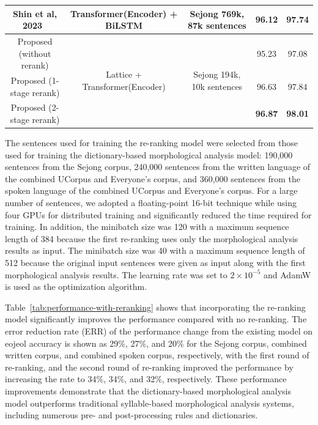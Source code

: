 \documentclass[AMS,STIX2COL]{WileyNJD-v2}
\begin{document}
\begin{table}[]
\begin{tabular*}{500pt}{@{\extracolsep\fill}ccc|cc@{\extracolsep\fill}}
            Shin et al, 2023~\cite{ShinHJ2023}    & Transformer(Encoder) + BiLSTM                   & Sejong 769k, 87k sentences                  & 96.12                      & 97.74                        \\
            \midrule
            Proposed (without rerank)             & \multirow{3}{*}{Lattice + Transformer(Encoder)} & \multirow{3}{*}{Sejong 194k, 10k sentences} & 95.23                      & 97.08                        \\
            Proposed (1-stage rerank)             & ~                                               & ~                                           & 96.63                      & 97.84                        \\
            Proposed (2-stage rerank)             & ~                                               & ~                                           & \textbf{96.87}             & \textbf{98.01}               \\
            \bottomrule
        \end{tabular*}
    \end{table}

    The sentences used for training the re-ranking model were selected from those used for training the dictionary-based morphological analysis model: 190,000 sentences from the Sejong corpus, 240,000 sentences from the written language of the combined UCorpus and Everyone's corpus, and 360,000 sentences from the spoken language of the combined UCorpus and Everyone's corpus.
    For a large number of sentences, we adopted a floating-point 16-bit technique while using four GPUs for distributed training and significantly reduced the time required for training.
    In addition, the minibatch size was 120 with a maximum sequence length of 384 because the first re-ranking uses only the morphological analysis results as input.
    The minibatch size was 40 with a maximum sequence length of 512 because the original input sentences were given as input along with the first morphological analysis results.
    The learning rate was set to $2 \times 10^{-5}$ and AdamW is used as the optimization algorithm.

    Table~\ref{tab:performance-with-reranking} shows that incorporating the re-ranking model significantly improves the performance compared with no re-ranking.
    The error reduction rate (ERR) of the performance change from the existing model on eojeol accuracy is shown as 29\%, 27\%, and 20\% for the Sejong corpus, combined written corpus, and combined spoken corpus, respectively, with the first round of re-ranking, and the second round of re-ranking improved the performance by increasing the rate to 34\%, 34\%, and 32\%, respectively.
    These performance improvements demonstrate that the dictionary-based morphological analysis model outperforms traditional syllable-based morphological analysis systems, including numerous pre- and post-processing rules and dictionaries.
\end{document}
